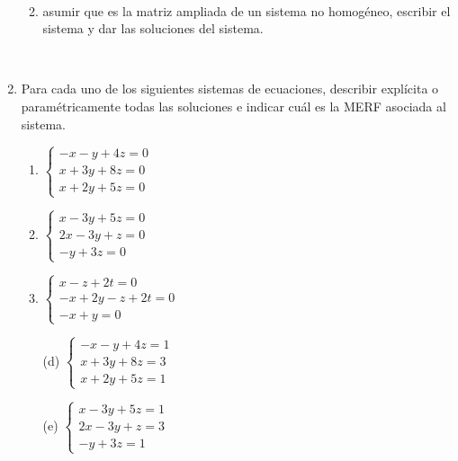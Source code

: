 \documentclass[12pt]{amsart}
\begin{document}
\begin{enumerate}
\begin{enumerate}
\

\item
asumir que es la matriz ampliada de un sistema no homog\'eneo, escribir el sistema
y dar las soluciones del sistema.
\end{enumerate}

\

\item\label{sistemas homogeneos} Para cada uno de los siguientes sistemas de ecuaciones, describir expl\'icita o param\'etricamente todas las soluciones e indicar cu\'al es la MERF asociada al sistema.

\begin{multicols}{3}
\begin{enumerate}

\item $\begin{cases}
 -x - y + 4z = 0\\
 x+3y+8z = 0\\
 x+2y + 5z = 0
\end{cases}$

\item $\begin{cases}
 x - 3y + 5z = 0\\
 2x-3y+z = 0\\
 -y + 3z = 0
\end{cases}$


\item $\begin{cases}
x-z+2t = 0\\
-x+2y-z+2t = 0\\
-x+y = 0
\end{cases}$

\end{enumerate}
\end{multicols}

\begin{multicols}{3}
\begin{enumerate}

\item[(d)] $\begin{cases}
 -x - y + 4z = 1\\
 x+3y+8z = 3\\
 x+2y + 5z = 1
\end{cases}$

\item[(e)] $\begin{cases}
 x - 3y + 5z = 1\\
 2x-3y+z = 3\\
 -y + 3z = 1
\end{cases}$



\end{enumerate}
\end{multicols}
\end{enumerate}
\end{document}
